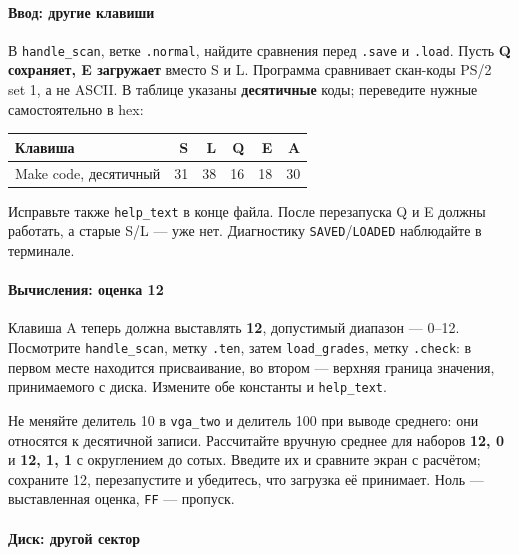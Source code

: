 \hypertarget{ux432ux432ux43eux434-ux434ux440ux443ux433ux438ux435-ux43aux43bux430ux432ux438ux448ux438}{%
\paragraph{Ввод: другие
клавиши}\label{ux432ux432ux43eux434-ux434ux440ux443ux433ux438ux435-ux43aux43bux430ux432ux438ux448ux438}}

В \texttt{handle\_scan}, ветке \texttt{.normal}, найдите сравнения перед
\texttt{.save} и \texttt{.load}. Пусть \textbf{Q сохраняет, E загружает}
вместо S и L. Программа сравнивает скан-коды PS/2 set 1, а не ASCII. В
таблице указаны \textbf{десятичные} коды; переведите нужные
самостоятельно в hex:

\begin{longtable}[]{@{}lrrrrr@{}}
\toprule
Клавиша & S & L & Q & E & A \\
\midrule
\endhead
Make code, десятичный & 31 & 38 & 16 & 18 & 30 \\
\bottomrule
\end{longtable}

Исправьте также \texttt{help\_text} в конце файла. После перезапуска Q и
E должны работать, а старые S/L --- уже нет. Диагностику
\texttt{SAVED}/\texttt{LOADED} наблюдайте в терминале.

\hypertarget{ux432ux44bux447ux438ux441ux43bux435ux43dux438ux44f-ux43eux446ux435ux43dux43aux430-12}{%
\paragraph{Вычисления: оценка
12}\label{ux432ux44bux447ux438ux441ux43bux435ux43dux438ux44f-ux43eux446ux435ux43dux43aux430-12}}

Клавиша A теперь должна выставлять \textbf{12}, допустимый диапазон ---
0--12. Посмотрите \texttt{handle\_scan}, метку \texttt{.ten}, затем
\texttt{load\_grades}, метку \texttt{.check}: в первом месте находится
присваивание, во втором --- верхняя граница значения, принимаемого с
диска. Измените обе константы и \texttt{help\_text}.

Не меняйте делитель 10 в \texttt{vga\_two} и делитель 100 при выводе
среднего: они относятся к десятичной записи. Рассчитайте вручную среднее
для наборов \textbf{12, 0} и \textbf{12, 1, 1} с округлением до сотых.
Введите их и сравните экран с расчётом; сохраните 12, перезапустите и
убедитесь, что загрузка её принимает. Ноль --- выставленная оценка,
\texttt{FF} --- пропуск.

\hypertarget{ux434ux438ux441ux43a-ux434ux440ux443ux433ux43eux439-ux441ux435ux43aux442ux43eux440}{%
\paragraph{Диск: другой
сектор}\label{ux434ux438ux441ux43a-ux434ux440ux443ux433ux43eux439-ux441ux435ux43aux442ux43eux440}}

